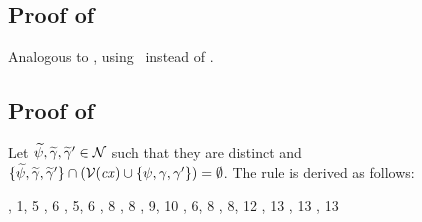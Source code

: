 \subsection*{Proof of }

Analogous to , using \Reexop\ instead of \Refaop.



\subsection*{Proof of }

Let $\widetilde{\psi},\widetilde{\gamma},\widetilde{\gamma}'\in\mathcal{N}$ such that they are distinct and
$\{\widetilde{\psi},\widetilde{\gamma},\widetilde{\gamma}'\}\cap
(\mathcal{V}(\mathit{cx})\cup\{\psi,\gamma,\gamma'\})=\emptyset$. The rule is
derived as follows:
\begin{derivation}
\step{\istyO{\typ}}{\hyp}
\step{\isty{\cx,\vdec{\varFXpred}{\tarr{\typ}{\bool}}}{\typ}}
     {, 1, 5}
\step{\hasty{\cx,\vdec{\varFXpred}{\tarr{\typ}{\bool}}}
            {\exopO}{\tarr{(\tarr{\typ}{\bool})}{\bool}}}
     {\Reexop, 6}
\step{\cxwf{\cx,\vdec{\varFXpred}{\tarr{\typ}{\bool}},\vdec{\varFX}{\typ}}}
     {\Rcxvdec, 5, 6}
\step{\hasty{\cx,\vdec{\varFXpred}{\tarr{\typ}{\bool}},\vdec{\varFX}{\typ}}
            {\varFXpred}{\tarr{\typ}{\bool}}}
     {\Revar, 8}
\step{\hasty{\cx,\vdec{\varFXpred}{\tarr{\typ}{\bool}},\vdec{\varFX}{\typ}}
            {\varFX}{\typ}}
     {\Revar, 8}
\step{\hasty{\cx,\vdec{\varFXpred}{\tarr{\typ}{\bool}},\vdec{\varFX}{\typ}}
            {\app{\varFXpred}{\varFX}}{\bool}}
     {\Reapp, 9, 10}
\step{\isty{\cx,\vdec{\varFXpred}{\tarr{\typ}{\bool}},\vdec{\varFX}{\typ}}
           {\typ}}
     {, 6, 8}
     {\Rcxvdec, 8, 12}
     {\Revar, 13}
     {\Revar, 13}
     {\Revar, 13}

\end{derivation}
